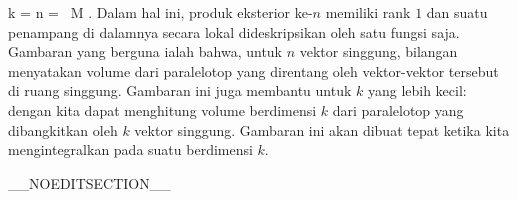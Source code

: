 {\mavergleichskette
{\vergleichskette
{ k
}
{ = }{ n
}
{ = }{  \, M
}
{    }{
}
{   }{
}
}
{}{}{.}
Dalam hal ini, produk eksterior ke-$n$ memiliki rank $1$
 {} {}
dan suatu penampang di dalamnya secara lokal dideskripsikan oleh satu fungsi saja. Gambaran yang berguna ialah bahwa, untuk $n$ vektor singgung, bilangan
 menyatakan volume
 {} {}
dari paralelotop yang direntang oleh vektor-vektor tersebut di ruang singgung. Gambaran ini juga membantu untuk $k$ yang lebih kecil: dengan
 kita dapat menghitung volume berdimensi $k$ dari paralelotop yang dibangkitkan oleh $k$ vektor singgung. Gambaran ini akan dibuat tepat ketika kita mengintegralkan pada suatu
berdimensi $k$.

}

__NOEDITSECTION__

